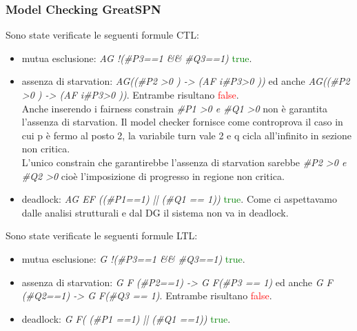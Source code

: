 \documentclass[a4paper]{article}
\begin{document}
\subsubsection{Model Checking GreatSPN}
Sono state verificate le seguenti formule CTL:
\begin{itemize}
	\item mutua esclusione: \textit{AG !(\#P3==1 \&\& \#Q3==1)} \textcolor{green}{true}.
	\item assenza di starvation: \textit{AG((\#P2 >0 ) -> (AF i\#P3>0 ))} ed anche \textit{AG((\#P2 >0 ) -> (AF i\#P3>0 ))}. Entrambe risultano \textcolor{red}{false}.\\
		Anche inserendo i fairness constrain \textit{\#P1 >0 \textit{e} \#Q1 >0} non è garantita l'assenza di starvation. Il model checker fornisce come controprova il caso in cui p è fermo al posto 2, la variabile turn vale 2 e q cicla all'infinito in sezione non critica.\\
		L'unico constrain che garantirebbe l'assenza di starvation sarebbe \textit{\#P2 >0 \textit{e} \#Q2 >0} cioè l'imposizione di progresso in regione non critica.
	\item deadlock: \textit{AG EF ((\#P1==1) || (\#Q1 == 1))} \textcolor{green}{true}. Come ci aspettavamo dalle analisi strutturali e dal DG il sistema non va in deadlock.
\end{itemize}
Sono state verificate le seguenti formule LTL:
\begin{itemize}
	\item mutua esclusione: \textit{G !(\#P3==1 \&\& \#Q3==1)} \textcolor{green}{true}.
	\item assenza di starvation: \textit{G F (\#P2==1) -> G F(\#P3 == 1)} ed anche \textit{G F (\#Q2==1) -> G F(\#Q3 == 1)}. Entrambe risultano \textcolor{red}{false}.\\
	\item deadlock: \textit{G F( (\#P1 ==1) ||  (\#Q1 ==1))} \textcolor{green}{true}.
\end{itemize}
\end{document}

